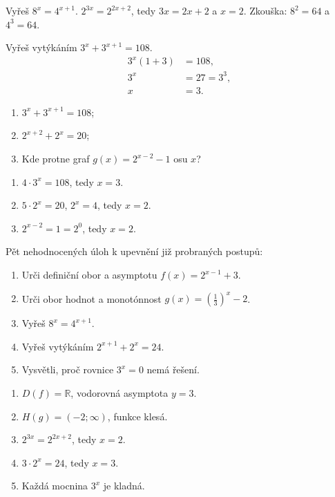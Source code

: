 \documentclass[11pt,a4paper]{article}
\begin{document}
\begin{prikladReseniBox}[title={Příklad 3}]
Vyřeš $8^x=4^{x+1}$.
\tcblower
$2^{3x}=2^{2x+2}$, tedy $3x=2x+2$ a $x=2$. Zkouška: $8^2=64$ a $4^3=64$.
\end{prikladReseniBox}
\begin{prikladReseniBox}[title={Příklad 4}]
Vyřeš vytýkáním $3^x+3^{x+1}=108$.
\tcblower
\[
\begin{aligned}
3^x(1+3)&=108,\\
3^x&=27=3^3,\\
x&=3.
\end{aligned}
\]
\end{prikladReseniBox}
\begin{zadaniReseniBox}[title={Samostatná práce 1}]
\begin{enumerate}[label=\alph*)]
\item $3^x+3^{x+1}=108$;
\item $2^{x+2}+2^x=20$;
\item Kde protne graf $g(x)=2^{x-2}-1$ osu $x$?
\end{enumerate}
\tcblower
\begin{enumerate}[label=\alph*)]
\item $4\cdot3^x=108$, tedy $x=3$.
\item $5\cdot2^x=20$, $2^x=4$, tedy $x=2$.
\item $2^{x-2}=1=2^0$, tedy $x=2$.
\end{enumerate}
\end{zadaniReseniBox}
\begin{zadaniReseniBox}[title={Domácí úkol}]
Pět nehodnocených úloh k upevnění již probraných postupů:
\begin{enumerate}[label=\alph*)]
\item Urči definiční obor a asymptotu $f(x)=2^{x-1}+3$.
\item Urči obor hodnot a monotónnost $g(x)=\left(\frac{1}{3}\right)^x-2$.
\item Vyřeš $8^x=4^{x+1}$.
\item Vyřeš vytýkáním $2^{x+1}+2^x=24$.
\item Vysvětli, proč rovnice $3^x=0$ nemá řešení.
\end{enumerate}
\tcblower
\begin{enumerate}[label=\alph*)]
\item $D(f)=\mathbb R$, vodorovná asymptota $y=3$.
\item $H(g)=(-2;\infty)$, funkce klesá.
\item $2^{3x}=2^{2x+2}$, tedy $x=2$.
\item $3\cdot2^x=24$, tedy $x=3$.
\item Každá mocnina $3^x$ je kladná.
\end{enumerate}
\end{zadaniReseniBox}
\end{document}
